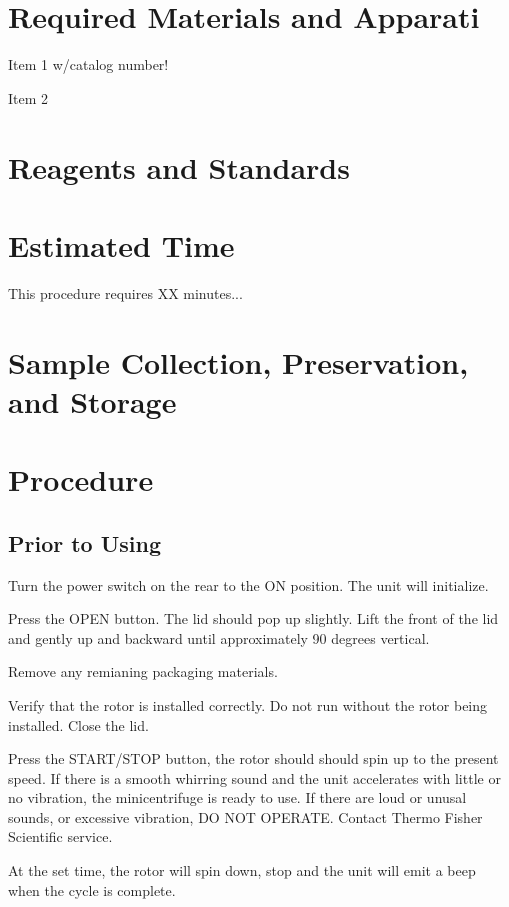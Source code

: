 \documentclass[12pt]{../SOP3_beta}
\begin{document}
\section{Required Materials and Apparati}

\NP Item 1 w/catalog number!

\NP Item 2

\section{Reagents and Standards}

\section{Estimated Time}

\NP This procedure requires XX minutes...

\section{Sample Collection, Preservation, and Storage}

\section{Procedure}

\subsection*{Prior to Using} 

\NP Turn the power switch on the rear to the ON position. The unit will initialize.

\NP Press the OPEN button. The lid should pop up slightly. Lift the front of the lid and gently up and backward until approximately 90 degrees vertical. 

\NP Remove any remianing packaging materials. 

\NP Verify that the rotor is installed correctly. Do not run without the rotor being installed. Close the lid.

\NP Press the START/STOP button, the rotor should should spin up to the present speed. If there is a smooth whirring sound and the unit accelerates with little or no vibration, the minicentrifuge is ready to use. If there are loud or unusal sounds, or excessive vibration, DO NOT OPERATE. Contact Thermo Fisher Scientific service.

\NP At the set time, the rotor will spin down, stop and the unit will emit a beep when the cycle is complete. 
\end{document}
